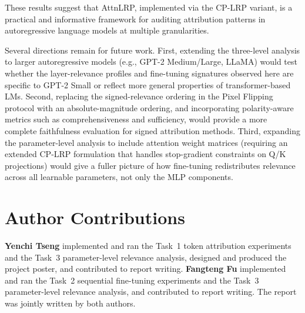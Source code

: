 \documentclass[10pt,twocolumn,letterpaper]{article}
\begin{document}
These results suggest that AttnLRP, implemented via the CP-LRP variant, is a
practical and informative framework for auditing attribution patterns in
autoregressive language models at multiple granularities.

Several directions remain for future work.
First, extending the three-level analysis to larger autoregressive models
(e.g., GPT-2 Medium/Large, LLaMA) would test whether the layer-relevance
profiles and fine-tuning signatures observed here are specific to GPT-2 Small
or reflect more general properties of transformer-based LMs.
Second, replacing the signed-relevance ordering in the Pixel Flipping
protocol with an absolute-magnitude ordering, and incorporating
polarity-aware metrics such as comprehensiveness and sufficiency, would
provide a more complete faithfulness evaluation for signed attribution methods.
Third, expanding the parameter-level analysis to include attention weight
matrices (requiring an extended CP-LRP formulation that handles stop-gradient
constraints on Q/K projections) would give a fuller picture of how fine-tuning
redistributes relevance across all learnable parameters, not only the MLP
components.

\section*{Author Contributions}

\textbf{Yenchi Tseng} implemented and ran the Task~1 token attribution
experiments and the Task~3 parameter-level relevance analysis, designed and
produced the project poster, and contributed to report writing.
\textbf{Fangteng Fu} implemented and ran the Task~2 sequential fine-tuning
experiments and the Task~3 parameter-level relevance analysis, and contributed
to report writing.
The report was jointly written by both authors.
\end{document}
